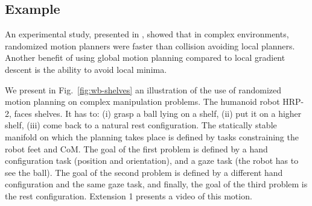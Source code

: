 \documentclass{article}
\begin{document}
\subsection{Example}

An experimental study, presented in  \cite{dalibard09}, showed that
in complex environments, randomized motion planners were faster than
collision avoiding local planners. Another benefit of using global motion
planning compared to local gradient descent is the ability to avoid local 
minima. 


We present in Fig.~\ref{fig:wb-shelves} an illustration of 
the use of randomized motion planning 
on complex manipulation problems. The humanoid robot HRP-2, faces shelves. It has to: (i) grasp
a ball lying on a shelf, (ii) put it on a higher shelf, (iii) come back to a natural
rest configuration. The statically stable manifold on which the planning takes place is
defined by tasks constraining the robot feet and CoM. The goal of the first problem
is defined by a hand configuration task (position and orientation), and a gaze task
(the robot has to see the ball). The goal of the second problem is defined by a 
different hand configuration and the same gaze task,
and finally, the goal of the third problem is the rest configuration.
Extension 1 presents a video of this motion.
\end{document}
